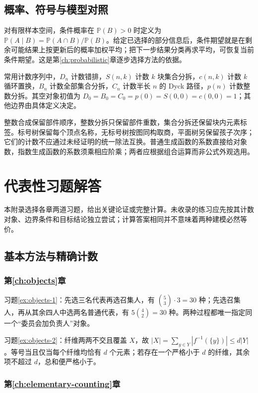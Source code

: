 \documentclass[UTF8,12pt,a4paper,fontset=fandol]{ctexbook}
\begin{document}
\section{概率、符号与模型对照}

对有限样本空间，条件概率在 $\mathbb P(B)>0$ 时定义为 $\mathbb P(A\mid B)=\mathbb P(A\cap B)/\mathbb P(B)$。给定已选择的部分信息后，条件期望就是在剩余可能结果上按更新后的概率加权平均；把下一步结果分类再求平均，可恢复当前条件期望。这是第\ref{ch:probabilistic}章逐步选择方法的依据。

常用计数序列中，$D_n$ 计数错排，$S(n,k)$ 计数 $k$ 块集合分拆，$c(n,k)$ 计数 $k$ 循环置换，$B_n$ 计数全部集合分拆，$C_n$ 计数半长 $n$ 的 Dyck 路径，$p(n)$ 计数整数分拆。其空对象初值为 $D_0=B_0=C_0=p(0)=S(0,0)=c(0,0)=1$；其他边界由具体定义决定。

整数合成保留部件顺序，整数分拆只保留部件重数，集合分拆还保留块内元素标签。标号树保留每个顶点名称，无标号树按图同构取商，平面树另保留孩子次序；它们的计数不应通过未经证明的统一除法互换。普通生成函数的系数直接给对象数，指数生成函数的系数须乘相应阶乘；两者应根据组合运算而非公式外观选用。

\chapter{代表性习题解答}
\label{app:exercises}

本附录选择各章两道习题，给出关键论证或完整计算。未收录的练习应先按其计数对象、边界条件和目标结论独立尝试；计算答案相同并不意味着两种建模必然等价。

\section{基本方法与精确计数}

\subsection{第\ref{ch:objects}章}

习题\ref{ex:objects-1}：先选三名代表再选召集人，有 $\binom53\cdot3=30$ 种；先选召集人，再从其余四人中选两名普通代表，有 $5\binom42=30$ 种。两种过程都唯一指定同一个“委员会加负责人”对象。

习题\ref{ex:objects-2}：纤维两两不交且覆盖 $X$，故 $|X|=\sum_{y\in Y}|f^{-1}(\{y\})|\le d|Y|$。等号当且仅当每个纤维均恰有 $d$ 个元素；若存在一个严格小于 $d$ 的纤维，其余项不超过 $d$，总和便严格小于。

\subsection{第\ref{ch:elementary-counting}章}
\end{document}
